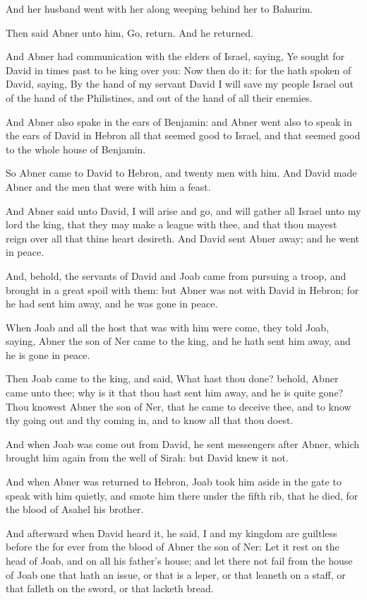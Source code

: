 \Verse And her husband went with her along weeping behind her to Bahurim.

Then said Abner unto him, Go, return. And he returned.

\Verse And Abner had communication with the elders of Israel, saying, Ye sought for David in times past to be king over you: \Verse Now then do it: for the \LORD hath spoken of David, saying, By the hand of my servant David I will save my people Israel out of the hand of the Philistines, and out of the hand of all their enemies.

\Verse And Abner also spake in the ears of Benjamin: and Abner went also to speak in the ears of David in Hebron all that seemed good to Israel, and that seemed good to the whole house of Benjamin.

\Verse So Abner came to David to Hebron, and twenty men with him. And David made Abner and the men that were with him a feast.

\Verse And Abner said unto David, I will arise and go, and will gather all Israel unto my lord the king, that they may make a league with thee, and that thou mayest reign over all that thine heart desireth.  And David sent Abner away; and he went in peace.

\Verse And, behold, the servants of David and Joab came from pursuing a troop, and brought in a great spoil with them: but Abner was not with David in Hebron; for he had sent him away, and he was gone in peace.

\Verse When Joab and all the host that was with him were come, they told Joab, saying, Abner the son of Ner came to the king, and he hath sent him away, and he is gone in peace.

\Verse Then Joab came to the king, and said, What hast thou done?  behold, Abner came unto thee; why is it that thou hast sent him away, and he is quite gone?  \Verse Thou knowest Abner the son of Ner, that he came to deceive thee, and to know thy going out and thy coming in, and to know all that thou doest.

\Verse And when Joab was come out from David, he sent messengers after Abner, which brought him again from the well of Sirah: but David knew it not.

\Verse And when Abner was returned to Hebron, Joab took him aside in the gate to speak with him quietly, and smote him there under the fifth rib, that he died, for the blood of Asahel his brother.

\Verse And afterward when David heard it, he said, I and my kingdom are guiltless before the \LORD for ever from the blood of Abner the son of Ner: \Verse Let it rest on the head of Joab, and on all his father's house; and let there not fail from the house of Joab one that hath an issue, or that is a leper, or that leaneth on a staff, or that falleth on the sword, or that lacketh bread.

